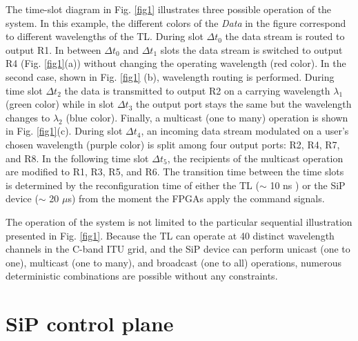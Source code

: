 The time-slot diagram in Fig. \ref{fig1} illustrates three possible operation of the system. In this example, the different colors of the \textit{Data} in the figure correspond to different wavelengths of the TL. During slot $\Delta t_0$ the data stream is routed to output R1. In between $\Delta t_0$ and $\Delta t_1$ slots the data stream is switched to output R4  (Fig. \ref{fig1}(a)) without changing the operating wavelength (red color). In the second case, shown in Fig. \ref{fig1} (b), wavelength routing is performed. During time slot $\Delta t_2$ the data is transmitted to output R2 on a carrying wavelength $\lambda_1$ (green color) while in slot $\Delta t_3$ the output port stays the same but the wavelength changes to $\lambda_2$ (blue color).  Finally, a multicast (one to many) operation is shown in Fig. \ref{fig1}(c). During slot  $\Delta t_4$, an incoming data stream modulated on a user's chosen wavelength (purple color) is split among four output ports: R2, R4, R7, and R8.  In the following time slot  $\Delta t_5$, the recipients of the multicast operation are modified to R1, R3, R5, and R6. The transition time between the time slots is determined by the reconfiguration time of either the TL ($\sim$ 10 ns \cite{browning2013optical}) or the SiP device ($\sim$ 20 $\mu$s) from the moment the FPGAs apply the command signals.

The operation of the system is not limited to the particular sequential illustration presented in Fig. \ref{fig1}.  Because the TL can operate at 40 distinct wavelength channels in the C-band ITU grid, and the SiP device can perform unicast (one to one), multicast (one to many), and broadcast (one to all) operations, numerous deterministic combinations are possible without any constraints. 

\section{SiP control plane}


